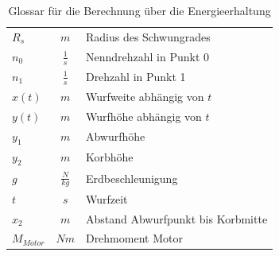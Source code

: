 \begin{table}[h!]
\begin{tabular}{lcl}
   	\rule{0pt}{11pt}$R_s$ & $m$ & Radius des Schwungrades \\
   	\rule{0pt}{11pt}$n_0$ & $\frac{1}{s}$ & Nenndrehzahl in Punkt 0 \\
   	\rule{0pt}{11pt}$n_1$ & $\frac{1}{s}$ & Drehzahl in Punkt 1 \\
   	\rule{0pt}{11pt}$x(t)$ & $m$ & Wurfweite abhängig von $t$ \\
   	\rule{0pt}{11pt}$y(t)$ & $m$ & Wurfhöhe abhängig von $t$ \\
   	\rule{0pt}{11pt}$y_1$ & $m$ & Abwurfhöhe \\
   	\rule{0pt}{11pt}$y_2$ & $m$ & Korbhöhe \\
   	\rule{0pt}{11pt}$g$ & $\frac{N}{kg}$ & Erdbeschleunigung \\
   	\rule{0pt}{11pt}$t$ & $s$ & Wurfzeit \\
   	\rule{0pt}{11pt}$x_2$ & $m$ & Abstand Abwurfpunkt bis Korbmitte \\
   	\rule{0pt}{11pt}$M_{Motor}$ & $Nm$ & Drehmoment Motor \\
    \end{tabular}
    \centering
    \caption{Glossar für die Berechnung über die Energieerhaltung}
    \label{tab:glossarEnergie}
\end{table}


